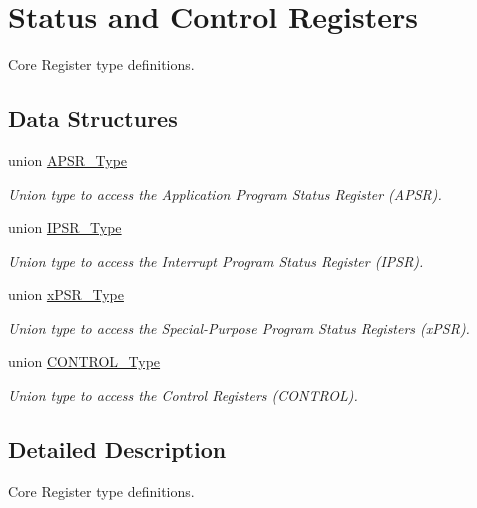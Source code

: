 \hypertarget{group__CMSIS__CORE}{\section{Status and Control Registers}
\label{group__CMSIS__CORE}
}


Core Register type definitions.  


\subsection*{Data Structures}
\begin{DoxyCompactItemize}
\item 
union \hyperlink{unionAPSR__Type}{A\-P\-S\-R\-\_\-\-Type}
\begin{DoxyCompactList}\small\item\em Union type to access the Application Program Status Register (A\-P\-S\-R). \end{DoxyCompactList}\item 
union \hyperlink{unionIPSR__Type}{I\-P\-S\-R\-\_\-\-Type}
\begin{DoxyCompactList}\small\item\em Union type to access the Interrupt Program Status Register (I\-P\-S\-R). \end{DoxyCompactList}\item 
union \hyperlink{unionxPSR__Type}{x\-P\-S\-R\-\_\-\-Type}
\begin{DoxyCompactList}\small\item\em Union type to access the Special-\/\-Purpose Program Status Registers (x\-P\-S\-R). \end{DoxyCompactList}\item 
union \hyperlink{unionCONTROL__Type}{C\-O\-N\-T\-R\-O\-L\-\_\-\-Type}
\begin{DoxyCompactList}\small\item\em Union type to access the Control Registers (C\-O\-N\-T\-R\-O\-L). \end{DoxyCompactList}\end{DoxyCompactItemize}


\subsection{Detailed Description}
Core Register type definitions. 